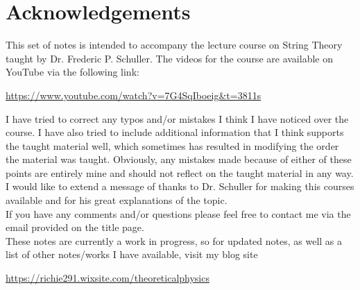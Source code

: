 \documentclass[11pt,oneside]{book}
\theoremstyle{definition} %
\theoremstyle{plain} %
\theoremstyle{remark} %
\theoremstyle{underline}
\begin{document}

\newpage
\section*{Acknowledgements}

This set of notes is intended to accompany the lecture course on String Theory taught by Dr. Frederic P. Schuller. The videos for the course are available on YouTube via the following link:

\begin{center}
    \href{https://www.youtube.com/watch?v=7G4SqIboeig&t=3811s}{https://www.youtube.com/watch?v=7G4SqIboeig\&t=3811s}
\end{center}

I have tried to correct any typos and/or mistakes I think I have noticed over the course. I have also tried to include additional information that I think supports the taught material well, which sometimes has resulted in modifying the order the material was taught. Obviously, any mistakes made because of either of these points are entirely mine and should not reflect on the taught material in any way. \\



I would like to extend a message of thanks to Dr. Schuller for making this courses available and for his great explanations of the topic. \\

If you have any comments and/or questions please feel free to contact me via the email provided on the title page. \\

These notes are currently a work in progress, so for updated notes, as well as a list of other notes/works I have available, visit my blog site

\begin{center}
    \href{https://richie291.wixsite.com/theoreticalphysics}{https://richie291.wixsite.com/theoreticalphysics}
\end{center}
\end{document}
